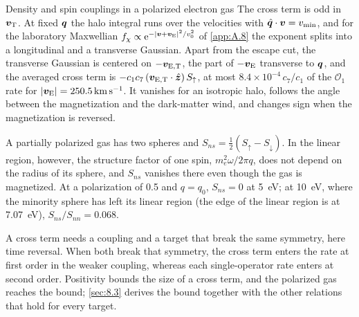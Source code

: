 \begin{workedexample}{Density and spin couplings in a polarized electron gas}
The cross term is odd in $\bm{v}_{\mathrm{T}}$. At fixed $\bm{q}$ the halo integral runs over the velocities with $\hat{\bm{q}}\cdot\bm{v} = v_{\mathrm{min}}$, and for the laboratory Maxwellian $f_\chi \propto \mathrm{e}^{-|\bm{v} + \bm{v}_{\mathrm{E}}|^2/v_0^2}$ of \cref{app:A.8} the exponent splits into a longitudinal and a transverse Gaussian. Apart from the escape cut, the transverse Gaussian is centered on $-\bm{v}_{\mathrm{E},\mathrm{T}}$, the part of $-\bm{v}_{\mathrm{E}}$ transverse to $\bm{q}$, and the averaged cross term is $-c_1c_7\,(\bm{v}_{\mathrm{E},\mathrm{T}}\cdot\hat{\bm{z}})\,S_\uparrow$, at most $8.4\times10^{-4}\,c_7/c_1$ of the $\mathcal{O}_1$ rate for $|\bm{v}_{\mathrm{E}}| = \SI{250.5}{km.s^{-1}}$. It vanishes for an isotropic halo, follows the angle between the magnetization and the dark-matter wind, and changes sign when the magnetization is reversed.

A partially polarized gas has two spheres and $S_{ns} = \frac12(S_\uparrow - S_\downarrow)$. In the linear region, however, the structure factor of one spin, $m_e^2\omega/2\pi q$, does not depend on the radius of its sphere, and $S_{ns}$ vanishes there even though the gas is magnetized. At a polarization of 0.5 and $q = q_0$, $S_{ns} = 0$ at \SI{5}{eV}; at \SI{10}{eV}, where the minority sphere has left its linear region (the edge of the linear region is at \SI{7.07}{eV}), $S_{ns}/S_{nn} = 0.068$.
\end{workedexample}

A cross term needs a coupling and a target that break the same symmetry, here time reversal. When both break that symmetry, the cross term enters the rate at first order in the weaker coupling, whereas each single-operator rate enters at second order. Positivity bounds the size of a cross term, and the polarized gas reaches the bound; \cref{sec:8.3} derives the bound together with the other relations that hold for every target.
